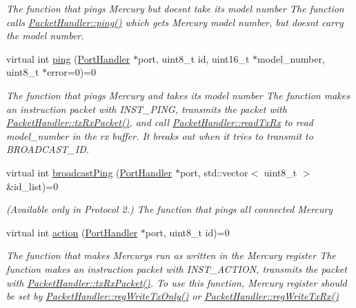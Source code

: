 \begin{DoxyCompactItemize}
\begin{DoxyCompactList}\small\item\em The function that pings Mercury but doesn\textquotesingle{}t take its model number  The function calls \hyperlink{classmercury_1_1_packet_handler_a5fce347ac1f55de301e50bac01c58f4f}{Packet\+Handler\+::ping()} which gets Mercury model number,  but doesn\textquotesingle{}t carry the model number. \end{DoxyCompactList}\item 
virtual int \hyperlink{classmercury_1_1_packet_handler_a10c18ef1d19f531f71c3996f10b6426d}{ping} (\hyperlink{classmercury_1_1_port_handler}{Port\+Handler} $\ast$port, uint8\+\_\+t id, uint16\+\_\+t $\ast$model\+\_\+number, uint8\+\_\+t $\ast$error=0)=0
\begin{DoxyCompactList}\small\item\em The function that pings Mercury and takes its model number  The function makes an instruction packet with I\+N\+S\+T\+\_\+\+P\+I\+NG,  transmits the packet with \hyperlink{classmercury_1_1_packet_handler_ac7ceeaec210827d119199144badaad3a}{Packet\+Handler\+::tx\+Rx\+Packet()},  and call \hyperlink{classmercury_1_1_packet_handler_ac743a57bba9e71aadb1578f0e704f166}{Packet\+Handler\+::read\+Tx\+Rx} to read model\+\_\+number in the rx buffer.  It breaks out  when it tries to transmit to B\+R\+O\+A\+D\+C\+A\+S\+T\+\_\+\+ID. \end{DoxyCompactList}\item 
virtual int \hyperlink{classmercury_1_1_packet_handler_aae8b5fb10e57973884589a0318e30fad}{broadcast\+Ping} (\hyperlink{classmercury_1_1_port_handler}{Port\+Handler} $\ast$port, std\+::vector$<$ uint8\+\_\+t $>$ \&id\+\_\+list)=0
\begin{DoxyCompactList}\small\item\em (Available only in Protocol 2.) The function that pings all connected Mercury \end{DoxyCompactList}\item 
virtual int \hyperlink{classmercury_1_1_packet_handler_a2ce31bd650d032c4bff957c9e453f38e}{action} (\hyperlink{classmercury_1_1_port_handler}{Port\+Handler} $\ast$port, uint8\+\_\+t id)=0
\begin{DoxyCompactList}\small\item\em The function that makes Mercurys run as written in the Mercury register  The function makes an instruction packet with I\+N\+S\+T\+\_\+\+A\+C\+T\+I\+ON,  transmits the packet with \hyperlink{classmercury_1_1_packet_handler_ac7ceeaec210827d119199144badaad3a}{Packet\+Handler\+::tx\+Rx\+Packet()}.  To use this function, Mercury register should be set by \hyperlink{classmercury_1_1_packet_handler_a0b0daaabd6473e14b2fbfbbf3260bc7b}{Packet\+Handler\+::reg\+Write\+Tx\+Only()} or \hyperlink{classmercury_1_1_packet_handler_a9944f0271cdcc637429b678a3cd73273}{Packet\+Handler\+::reg\+Write\+Tx\+Rx()} \end{DoxyCompactList}\item 

\end{DoxyCompactItemize}
